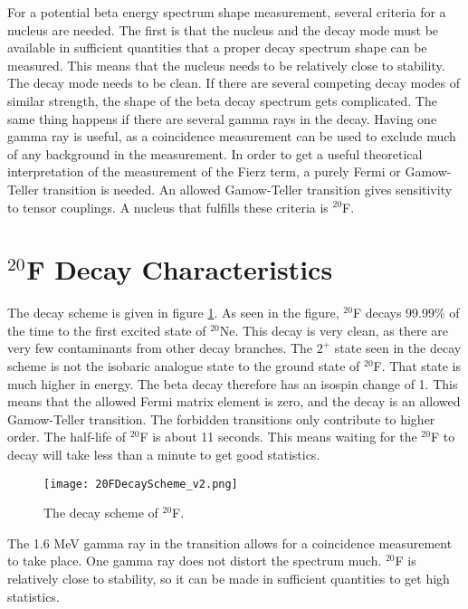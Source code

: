 \documentclass[../MaxHughesThesis.tex]{subfiles}
\begin{document}
For a potential beta energy spectrum shape measurement, several criteria for a nucleus are needed.
The first is that the nucleus and the decay mode must be available in sufficient quantities that a proper decay spectrum shape can be measured.
This means that the nucleus needs to be relatively close to stability.
The decay mode needs to be clean.
If there are several competing decay modes of similar strength, the shape of the beta decay spectrum gets complicated.
The same thing happens if there are several gamma rays in the decay. 
Having one gamma ray is useful, as a coincidence measurement can be used to exclude much of any background in the measurement.
In order to get a useful theoretical interpretation of the measurement of the Fierz term, a purely Fermi or Gamow-Teller transition is needed.
An allowed Gamow-Teller transition gives sensitivity to tensor couplings. 
A nucleus that fulfills these criteria is $^{20}$F. 
 
\section{$^{20}$F Decay Characteristics}

The decay scheme is given in figure \ref{fig:DecayScheme}.
As seen in the figure, $^{20}$F decays 99.99\% of the time to the first excited state of $^{20}$Ne.
This decay is very clean, as there are very few contaminants from other decay branches. 
The $2^{+}$ state seen in the decay scheme is not the isobaric analogue state to the ground state of $^{20}$F.
That state is much higher in energy.
The beta decay therefore has an isospin change of 1.
This means that the allowed Fermi matrix element is zero, and the decay is an allowed Gamow-Teller transition. 
The forbidden transitions only contribute to higher order.
The half-life of $^{20}$F is about 11 seconds. 
This means waiting for the $^{20}$F to decay will take less than a minute to get good statistics.

\begin{figure}[!htb]
	\centerline{\texttt{[image: 20FDecayScheme\_v2.png]}}
	\caption{The decay scheme of $^{20}$F.}
	\label{fig:DecayScheme}
\end{figure}

The 1.6 MeV gamma ray in the transition allows for a coincidence measurement to take place.
One gamma ray does not distort the spectrum much. 
$^{20}$F is relatively close to stability, so it can be made in sufficient quantities to get high statistics.
\end{document}
